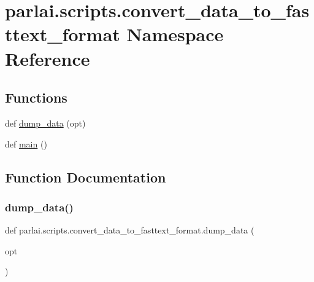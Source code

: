 \hypertarget{namespaceparlai_1_1scripts_1_1convert__data__to__fasttext__format}{}\section{parlai.\+scripts.\+convert\+\_\+data\+\_\+to\+\_\+fasttext\+\_\+format Namespace Reference}
\label{namespaceparlai_1_1scripts_1_1convert__data__to__fasttext__format}
\subsection*{Functions}
\begin{DoxyCompactItemize}
\item 
def \hyperlink{namespaceparlai_1_1scripts_1_1convert__data__to__fasttext__format_a8222f98bd2353f75b192224da0e07733}{dump\+\_\+data} (opt)
\item 
def \hyperlink{namespaceparlai_1_1scripts_1_1convert__data__to__fasttext__format_adef5d250b1de0b6c868a9eb4e699a81f}{main} ()
\end{DoxyCompactItemize}


\subsection{Function Documentation}
\mbox{\label{namespaceparlai_1_1scripts_1_1convert__data__to__fasttext__format_a8222f98bd2353f75b192224da0e07733}} 
\subsubsection{\texorpdfstring{dump\+\_\+data()}{dump\_data()}}
{\footnotesize\ttfamily def parlai.\+scripts.\+convert\+\_\+data\+\_\+to\+\_\+fasttext\+\_\+format.\+dump\+\_\+data (\begin{DoxyParamCaption}\item[{}]{opt }\end{DoxyParamCaption})}



